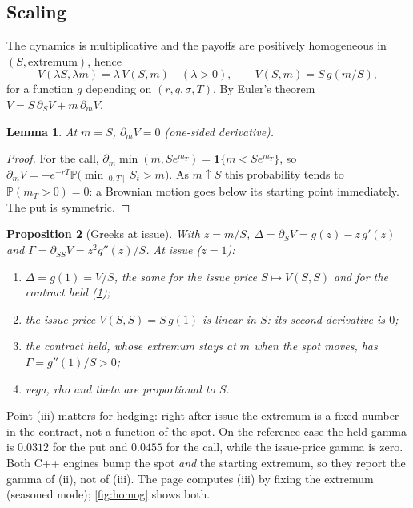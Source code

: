 \documentclass[11pt,a4paper]{article}
\newtheorem{proposition}{Proposition}
\newtheorem{lemma}[proposition]{Lemma}
\theoremstyle{remark}
\newcommand{\Prob}{\mathbb{P}}
\begin{document}
\subsection{Scaling}
The dynamics is multiplicative and the payoffs are positively homogeneous in $(S,\text{extremum})$, hence
\begin{equation}
  V(\lambda S,\lambda m)=\lambda\,V(S,m)\quad(\lambda>0),\qquad V(S,m)=S\,g(m/S),
\end{equation}
for a function $g$ depending on $(r,q,\sigma,T)$. By Euler's theorem $V=S\,\partial_SV+m\,\partial_mV$.

\begin{lemma}\label{lem:neumann}
At $m=S$, $\partial_mV=0$ (one-sided derivative).
\end{lemma}
\begin{proof}
For the call, $\partial_m\min(m,Se^{m_T})=\mathbf 1\{m<Se^{m_T}\}$, so $\partial_mV=-e^{-rT}\Prob\big(\min_{[0,T]}S_t>m\big)$. As $m\uparrow S$
this probability tends to $\Prob(m_T>0)=0$: a Brownian motion goes below its starting point immediately. The put is symmetric.
\end{proof}

\begin{proposition}[Greeks at issue]\label{prop:greeks}
With $z=m/S$, $\Delta=\partial_SV=g(z)-z\,g'(z)$ and $\Gamma=\partial_{SS}V=z^2g''(z)/S$. At issue ($z=1$):
\begin{enumerate}[nosep,label=(\roman*)]
  \item $\Delta=g(1)=V/S$, the same for the issue price $S\mapsto V(S,S)$ and for the contract held (\cref{lem:neumann});
  \item the issue price $V(S,S)=S\,g(1)$ is linear in $S$: its second derivative is $0$;
  \item the contract held, whose extremum stays at $m$ when the spot moves, has $\Gamma=g''(1)/S>0$;
  \item vega, rho and theta are proportional to $S$.
\end{enumerate}
\end{proposition}
Point (iii) matters for hedging: right after issue the extremum is a fixed number in the contract, not a function of the spot.
On the reference case the held gamma is $0.0312$ for the put and $0.0455$ for the call, while the issue-price gamma is zero. Both C++ engines bump the spot \emph{and} the starting extremum, so they report the
gamma of (ii), not of (iii). The page computes (iii) by fixing the extremum (seasoned mode); \cref{fig:homog} shows both.
\end{document}
